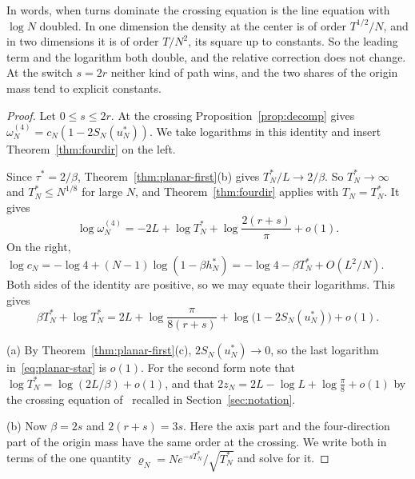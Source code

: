 In words, when turns dominate the crossing equation is the line equation with $\log N$
doubled. In one dimension the density at the center is of order $T^{1/2}/N$, and in two
dimensions it is of order $T/N^2$, its square up to constants. So the leading term and the
logarithm both double, and the relative correction does not change. At the switch $s=2r$ neither kind of path wins, and the two
shares of the origin mass tend to explicit constants.

\begin{proof}
Let $0\le s\le2r$. At the crossing Proposition~\ref{prop:decomp} gives
$\omega^{(4)}_N=c_N(1-2S_N(u^*_N))$. We take logarithms in this identity and insert
Theorem~\ref{thm:fourdir} on the left.

Since $\tau^*=2/\beta$, Theorem~\ref{thm:planar-first}(b) gives $T^*_N/L\to2/\beta$. So
$T^*_N\to\infty$ and $T^*_N\le N^{1/8}$ for large $N$, and Theorem~\ref{thm:fourdir} applies with
$T_N=T^*_N$. It gives
\[
 \log \omega^{(4)}_N=-2L+\log T^*_N+\log\frac{2(r+s)}\pi+o(1).
\]
On the right, $\log c_N=-\log4+(N-1)\log(1-\beta h^*_N)=-\log4-\beta T^*_N+O(L^2/N)$. Both sides of
the identity are positive, so we may equate their logarithms. This gives
\begin{equation}\label{eq:planar-star}
 \beta T^*_N+\log T^*_N=2L+\log\frac\pi{8(r+s)}+\log\bigl(1-2S_N(u^*_N)\bigr)+o(1).
\end{equation}

(a) By Theorem~\ref{thm:planar-first}(c), $2S_N(u^*_N)\to0$, so the last logarithm
in~\eqref{eq:planar-star} is $o(1)$. For the second form note that
$\log T^*_N=\log(2L/\beta)+o(1)$, and that $2z_N=2L-\log L+\log\frac\pi8+o(1)$ by the crossing
equation of~\cite{paperA} recalled in Section~\ref{sec:notation}.

(b) Now $\beta=2s$ and $2(r+s)=3s$. Here the axis part and the four-direction part of the origin
mass have the same order at the crossing. We write both in terms of the one quantity
$\varrho_N=Ne^{-sT^*_N}/\sqrt{T^*_N}$ and solve for it.


\end{proof}
